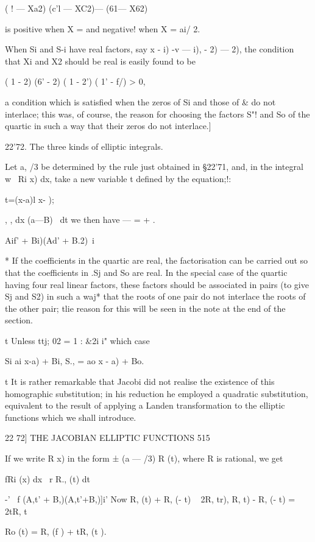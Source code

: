 ( ! — Xa2) (c'l — XC2)— (61— X62)

is positive when X = and negative! when X = ai/ 2.

When Si and S-i have real factors, say x - i) -v — i), - 2) — 2), the
condition that Xi and X2 should be real is easily found to be

( 1 - 2) (6' - 2) ( 1 - 2') ( 1' - f/) > 0,

a condition which is satisfied when the zeros of Si and those of \& do
not interlace; this was, of course, the reason for choosing the
factors S"! and So of the quartic in such a way that their zeros do
not interlace.]

22'72. The three kinds of elliptic integrals.

Let a, /3 be determined by the rule just obtained in §22'71, and, in
the integral w~ Ri x) dx, take a new variable t defined by the
equation;!:

t=(x-a)l x- );

 , , dx (a—B)~ dt we then have — = + .

    Aif' + Bi)(Ad' + B.2)\ i

* If the coefficients in the quartic are real, the factorisation can
be carried out so that the coefficients in .Sj and So are real. In the
special case of the quartic having four real linear factors, these
factors should be associated in pairs (to give Sj and S2) in such a
waj* that the roots of one pair do not interlace the roots of the
other pair; tlie reason for this will be seen in the note at the end
of the section.

t Unless ttj; 02 = 1 : \&2i i" which case

Si ai x-a) + Bi, S., = ao x - a) + Bo.

t It is rather remarkable that Jacobi did not realise the existence of
this homographic substitution; in his reduction he employed a
quadratic substitution, equivalent to the result of applying a Landen
transformation to the elliptic functions which we shall introduce.

22 72] THE JACOBIAN ELLIPTIC FUNCTIONS 515

If we write R x) in the form ± (a — /3) R (t), where R is rational, we
get

fRi (x) dx \ r R., (t) dt

-' ~f (A,t' + B,)(A,t'+B,)]i' Now R, (t) + R, (- t) ~ 2R, tr), R, t) -
R, (- t) = 2tR, t%

Ro (t) = R, (f ) + tR, (t ).

